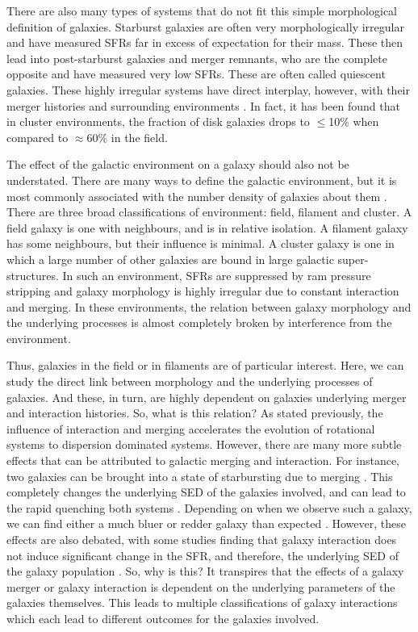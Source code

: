 There are also many types of systems that do not fit this simple morphological definition of galaxies. Starburst galaxies are often very morphologically irregular and have measured SFRs far in excess of expectation for their mass. These then lead into post-starburst galaxies and merger remnants, who are the complete opposite and have measured very low SFRs. These are often called quiescent galaxies. These highly irregular systems have direct interplay, however, with their merger histories and surrounding environments \citep{2018MNRAS.477.1708P, 2020MNRAS.493.3716H}. In fact, it has been found that in cluster environments, the fraction of disk galaxies drops to $\leq$10\% when compared to $\approx$60\% in the field.

The effect of the galactic environment on a galaxy should also not be understated. There are many ways to define the galactic environment, but it is most commonly associated with the number density of galaxies about them \citep{2003ApJ...585..694E, 2004ApJ...615L.101B}. There are three broad classifications of environment: field, filament and cluster. A field galaxy is one with neighbours, and is in relative isolation. A filament galaxy has some neighbours, but their influence is minimal. A cluster galaxy is one in which a large number of other galaxies are bound in large galactic super-structures. In such an environment, SFRs are suppressed \citep{2006MNRAS.373..469B} by ram pressure stripping and galaxy morphology is highly irregular due to constant interaction and merging. In these environments, the relation between galaxy morphology and the underlying processes is almost completely broken by interference from the environment.

Thus, galaxies in the field or in filaments are of particular interest. Here, we can study the direct link between morphology and the underlying processes of galaxies. And these, in turn, are highly dependent on galaxies underlying merger and interaction histories. So, what is this relation? As stated previously, the influence of interaction and merging accelerates the evolution of rotational systems to dispersion dominated systems. However, there are many more subtle effects that can be attributed to galactic merging and interaction. For instance, two galaxies can be brought into a state of starbursting due to merging \citep{2008MNRAS.385L..38M}. This completely changes the underlying SED of the galaxies involved, and can lead to the rapid quenching both systems \citep{2018MNRAS.476.2591V, 2022MNRAS.517L..92E}. Depending on when we observe such a galaxy, we can find either a much bluer or redder galaxy than expected \citep{2007A&A...468...61D}. However, these effects are also debated, with some studies finding that galaxy interaction does not induce significant change in the SFR, and therefore, the underlying SED of the galaxy population \citep{2003A&A...405...31B}. So, why is this? It transpires that the effects of a galaxy merger or galaxy interaction is dependent on the underlying parameters of the galaxies themselves. This leads to multiple classifications of galaxy interactions which each lead to different outcomes for the galaxies involved. 

